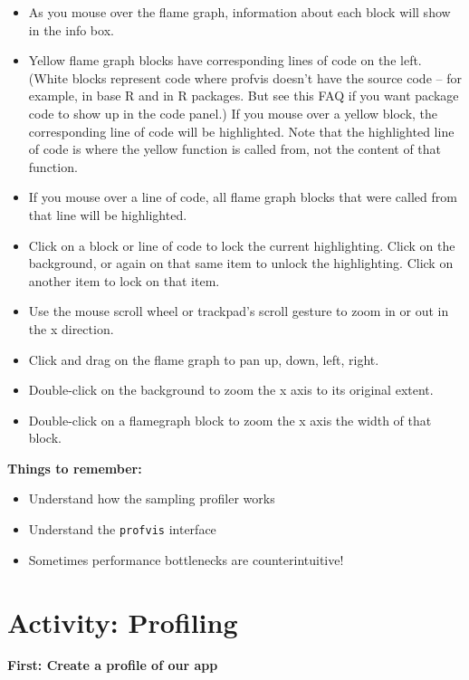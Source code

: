 \documentclass[]{book}
\providecommand{\tightlist}{%
  \setlength{\itemsep}{0pt}\setlength{\parskip}{0pt}}
\theoremstyle{definition}
\theoremstyle{definition}
\theoremstyle{definition}
\theoremstyle{remark}
\begin{document}
\begin{itemize}
\tightlist
\item
  As you mouse over the flame graph, information about each block will
  show in the info box.
\item
  Yellow flame graph blocks have corresponding lines of code on the
  left. (White blocks represent code where profvis doesn't have the
  source code -- for example, in base R and in R packages. But see this
  FAQ if you want package code to show up in the code panel.) If you
  mouse over a yellow block, the corresponding line of code will be
  highlighted. Note that the highlighted line of code is where the
  yellow function is called from, not the content of that function.
\item
  If you mouse over a line of code, all flame graph blocks that were
  called from that line will be highlighted.
\item
  Click on a block or line of code to lock the current highlighting.
  Click on the background, or again on that same item to unlock the
  highlighting. Click on another item to lock on that item.
\item
  Use the mouse scroll wheel or trackpad's scroll gesture to zoom in or
  out in the x direction.
\item
  Click and drag on the flame graph to pan up, down, left, right.
\item
  Double-click on the background to zoom the x axis to its original
  extent.
\item
  Double-click on a flamegraph block to zoom the x axis the width of
  that block.
\end{itemize}

\textbf{Things to remember:}

\begin{itemize}
\tightlist
\item
  Understand how the sampling profiler works
\item
  Understand the \texttt{profvis} interface
\item
  Sometimes performance bottlenecks are counterintuitive!
\end{itemize}

\hypertarget{activity-profiling}{%
\section{Activity: Profiling}\label{activity-profiling}}

\textbf{First: Create a profile of our app}
\end{document}
